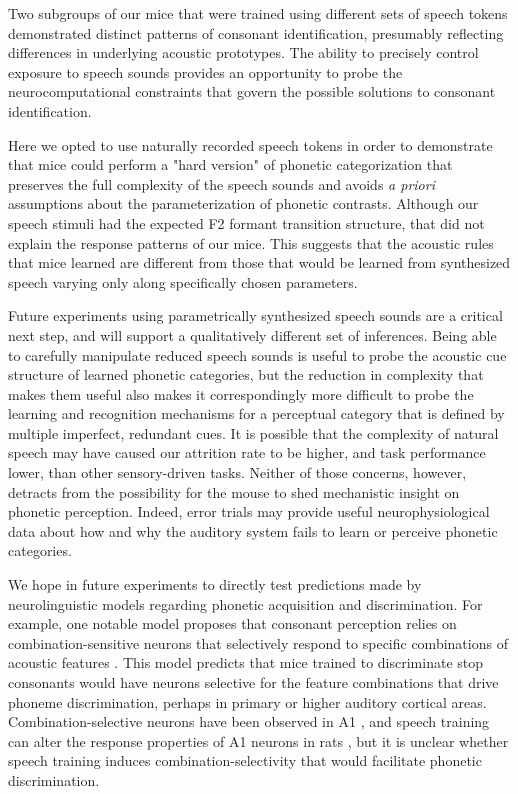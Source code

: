 Two subgroups of our mice that were trained using different sets of speech tokens demonstrated distinct patterns of consonant identification, presumably reflecting differences in underlying acoustic prototypes. The ability to precisely control exposure to speech sounds provides an opportunity to probe the neurocomputational constraints that govern the possible solutions to consonant identification.

Here we opted to use naturally recorded speech tokens in order to demonstrate that mice could perform a "hard version" of phonetic categorization that preserves the full complexity of the speech sounds and avoids \textit{a priori} assumptions about the parameterization of phonetic contrasts. Although our speech stimuli had the expected F2 formant transition structure, that did not explain the response patterns of our mice. This suggests that the acoustic rules that mice learned are different from those that would be learned from synthesized speech varying only along specifically chosen parameters.

Future experiments using parametrically synthesized speech sounds are a critical next step, and will support a qualitatively different set of inferences. Being able to carefully manipulate reduced speech sounds is useful to probe the acoustic cue structure of learned phonetic categories, but the reduction in complexity that makes them useful also makes it correspondingly more difficult to probe the learning and recognition mechanisms for a perceptual category that is defined by multiple imperfect, redundant cues. It is possible that the complexity of natural speech may have caused our attrition rate to be higher, and task performance lower, than other sensory-driven tasks. Neither of those concerns, however, detracts from the possibility for the mouse to shed mechanistic insight on phonetic perception. Indeed, error trials may provide useful neurophysiological data about how and why the auditory system fails to learn or perceive phonetic categories.

We hope in future experiments to directly test predictions made by neurolinguistic models regarding phonetic acquisition and discrimination. For example, one notable model proposes that consonant perception relies on combination-sensitive neurons that selectively respond to specific combinations of acoustic features \citep{Sussman1998}. This model predicts that mice trained to discriminate stop consonants would have neurons selective for the feature combinations that drive phoneme discrimination, perhaps in primary or higher auditory cortical areas. Combination-selective neurons have been observed in A1 \citep{Sadagopan2009,Wang2005a}, and speech training can alter the response properties of A1 neurons in rats \citep{Engineer2015}, but it is unclear whether speech training induces combination-selectivity that would facilitate phonetic discrimination.

